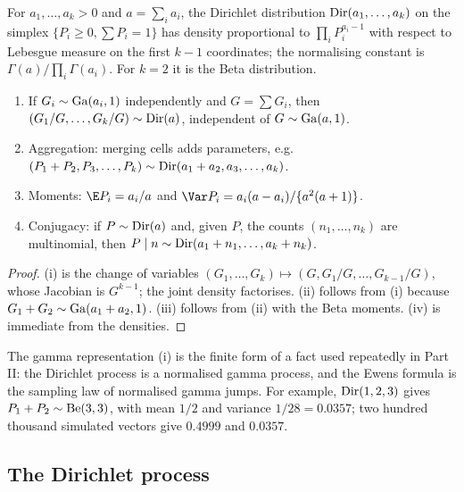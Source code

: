 \begin{definition}\label{toolkit:def:dir}
For $a_1,\dots,a_k>0$ and $a=\sum_ia_i$, the Dirichlet distribution $\mathrm{Dir}(a_1,\dots,a_k)$ on the
simplex $\{P_i\ge0,\sum P_i=1\}$ has density proportional to $\prod_iP_i^{a_i-1}$ with respect to
Lebesgue measure on the first $k-1$ coordinates; the normalising constant is
$\Gamma(a)/\prod_i\Gamma(a_i)$. For $k=2$ it is the Beta distribution.
\end{definition}

\begin{proposition}\label{toolkit:prop:dir}
\begin{enumerate}[label=(\roman*)]
\item If $G_i\sim\mathrm{Ga}(a_i,1)$ independently and $G=\sum G_i$, then $(G_1/G,\dots,G_k/G)\sim\mathrm{Dir}(a)$,
independent of $G\sim\mathrm{Ga}(a,1)$.
\item Aggregation: merging cells adds parameters, e.g. $(P_1+P_2,P_3,\dots,P_k)\sim
\mathrm{Dir}(a_1+a_2,a_3,\dots,a_k)$.
\item Moments: $\E P_i=a_i/a$ and $\Var P_i=a_i(a-a_i)/\{a^2(a+1)\}$.
\item Conjugacy: if $P\sim\mathrm{Dir}(a)$ and, given $P$, the counts $(n_1,\dots,n_k)$ are multinomial,
then $P\mid n\sim\mathrm{Dir}(a_1+n_1,\dots,a_k+n_k)$.
\end{enumerate}
\end{proposition}

\begin{proof}
(i) is the change of variables $(G_1,\dots,G_k)\mapsto(G,G_1/G,\dots,G_{k-1}/G)$, whose Jacobian
is $G^{k-1}$; the joint density factorises. (ii) follows from (i) because $G_1+G_2\sim\mathrm{Ga}(a_1+a_2,1)$.
(iii) follows from (ii) with the Beta moments. (iv) is immediate from the densities.
\end{proof}

The gamma representation (i) is the finite form of a fact used repeatedly in Part II: the
Dirichlet process is a normalised gamma process, and the Ewens formula is the sampling law of
normalised gamma jumps. For example, $\mathrm{Dir}(1,2,3)$ gives $P_1+P_2\sim\mathrm{Be}(3,3)$, with mean $1/2$
and variance $1/28=0.0357$; two hundred thousand simulated vectors give $0.4999$ and $0.0357$.

\subsection{The Dirichlet process}\label{toolkit:sec:dp}

